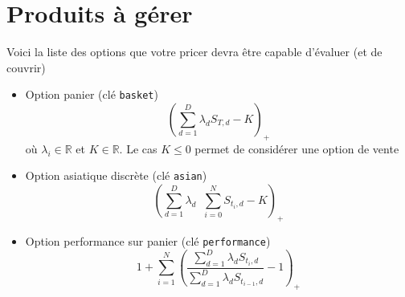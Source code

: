 \documentclass[a4paper,11pt]{article}
\def\R{{\mathbb R}}
\def\inv#1{\mathop{\frac{1}{ #1}}\nolimits}
\begin{document}
\section{Produits à gérer}
\label{sec:options}

Voici la liste des options que votre pricer devra être capable d'évaluer (et de couvrir)
\begin{itemize}
\item Option panier (clé \verb!basket!)
  \begin{equation*}
    \left( \sum_{d=1}^D \lambda_d S_{T,d} - K \right)_+
  \end{equation*}
  où $\lambda_i \in \R$ et $K \in \R$. Le cas $K \le 0$ permet de considérer une option de vente

\item Option asiatique discrète (clé \verb!asian!)
  \begin{equation*}
    \left(\sum_{d=1}^D \lambda_d \inv{N+1} \sum_{i=0}^{N} S_{t_i,d} - K\right)_+
  \end{equation*}

\item Option performance sur panier (clé \verb!performance!)
  \begin{equation*}
    1 + \sum_{i=1}^N \left( \frac{\sum_{d=1}^D \lambda_d
        S_{t_i,d}}{\sum_{d=1}^D \lambda_d
        S_{t_{i-1},d}} - 1 \right)_+
  \end{equation*}
\end{itemize}
\end{document}
